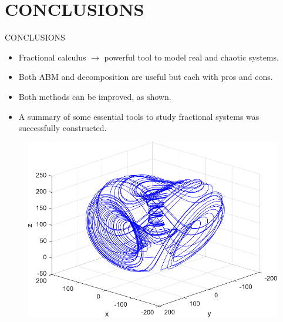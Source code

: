 \section{CONCLUSIONS}
\begin{frame}{CONCLUSIONS}
\begin{multicols}{2}
\begin{itemize}
    \item Fractional calculus $\longrightarrow$ powerful tool to model real and chaotic systems.
    \item Both ABM and decomposition are useful but each with pros and cons.
    \item Both methods can be improved, as shown.
    \item A summary of some essential tools to study fractional systems was successfully constructed.
\end{itemize}
\columnbreak
\begin{figure}[H]
    \centering
    \includegraphics[scale=0.4]{files/3d_chaos.pdf}
\end{figure}
\end{multicols}
\end{frame}